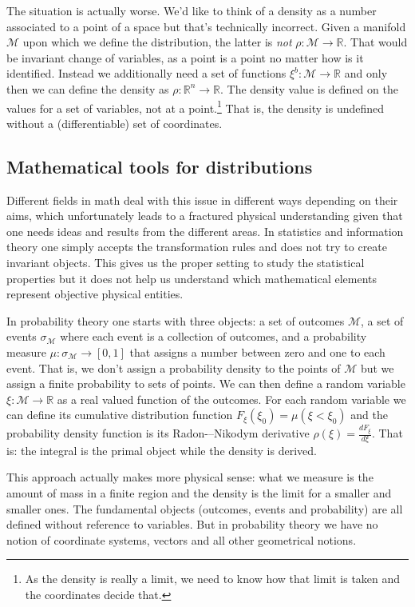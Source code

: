 \documentclass[11pt]{article}
\begin{document}
The situation is actually worse. We'd like to think of a density as a number associated to a point of a space but that's technically incorrect. Given a manifold $\mathcal{M}$ upon which we define the distribution, the latter is \emph{not} $\rho : \mathcal{M} \to \mathbb{R}$. That would be invariant change of variables, as a point is a point no matter how is it identified. Instead we additionally need a set of functions $\xi^b : \mathcal{M} \to \mathbb{R}$ and only then we can define the density as $\rho : \mathbb{R}^n \to \mathbb{R}$. The density value is defined on the values for a set of variables, not at a point.\footnote{As the density is really a limit, we need to know how that limit is taken and the coordinates decide that.} That is, the density is undefined without a (differentiable) set of coordinates.

\subsection*{Mathematical tools for distributions}

Different fields in math deal with this issue in different ways depending on their aims, which unfortunately leads to a fractured physical understanding given that one needs ideas and results from the different areas. In statistics and information theory one simply accepts the transformation rules and does not try to create invariant objects. This gives us the proper setting to study the statistical properties but it does not help us understand which mathematical elements represent objective physical entities.

In probability theory one starts with three objects: a set of outcomes $\mathcal{M}$, a set of events $\sigma_\mathcal{M}$ where each event is a collection of outcomes, and a probability measure $\mu : \sigma_\mathcal{M} \rightarrow [0,1]$ that assigns a number between zero and one to each event. That is, we don't assign a probability density to the points of $\mathcal{M}$ but we assign a finite probability to sets of points. We can then define a random variable $\xi : \mathcal{M} \rightarrow \mathbb{R}$ as a real valued function of the outcomes. For each random variable we can define its cumulative distribution function $F_\xi(\xi_0)=\mu(\xi<\xi_0)$ and the probability density function is its Radon-–Nikodym derivative $\rho(\xi) = \frac{dF_\xi}{d\xi}$. That is: the integral is the primal object while the density is derived.

This approach actually makes more physical sense: what we measure is the amount of mass in a finite region and the density is the limit for a smaller and smaller ones. The fundamental objects (outcomes, events and probability) are all defined without reference to variables. But in probability theory we have no notion of coordinate systems, vectors and all other geometrical notions.
\end{document}
